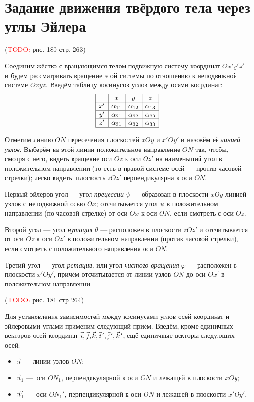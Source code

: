 \section{Задание движения твёрдого тела через углы Эйлера}

(\textcolor{red}{TODO:} рис. 180 стр. 263)

Соединим жёстко с вращающимся телом подвижную систему координат $Ox'y'z'$ и
будем рассматривать вращение этой системы по отношению к неподвижной системе
$Oxyz$. Введём таблицу косинусов углов между осями координат:
\begin{equation*}
  \begin{array}{|c|c|c|c|}
    \hline
    & x & y & z \\
    \hline
    x' & \alpha_{11} & \alpha_{12} & \alpha_{13} \\
    \hline
    y' & \alpha_{21} & \alpha_{22} & \alpha_{23} \\
    \hline
    z' & \alpha_{31} & \alpha_{32} & \alpha_{33} \\
    \hline
  \end{array}
\end{equation*}

Отметим линию $ON$ пересечения плоскостей $xOy$ и $x'Oy'$ и назовём её
\textit{линией узлов}. Выберём на этой линии положительное направление $ON$ так,
чтобы, смотря с него, видеть вращение оси $Oz$ к оси $Oz'$ на наименьший угол в
положительном направлении (то есть в правой системе осей --- против часовой
стрелки); легко видеть, плоскость $zOz'$ перпендикулярна к оси $ON$.

Первый эйлеров угол --- угол \textit{прецессии} $\psi$ --- образован в плоскости
$xOy$ линией узлов с неподвижной осью $Ox$; отсчитывается угол $\psi$ в
положительном направлении (по часовой стрелке) от оси $Ox$ к оси $ON$, если
смотреть с оси $Oz$.

Второй угол --- угол \textit{нутации} $\theta$ --- расположен в плоскости $zOz'$
и отсчитывается от оси $Oz$ к оси $Oz'$ в положительном направлении (против
часовой стрелки), если смотреть с положительного направления оси $ON$.

Третий угол --- угол \textit{ротации}, или угол \textit{чистого вращения}
$\varphi$ --- расположен в плоскости $x'Oy'$, причём отсчитывается от линии
узлов $ON$ до оси $Ox'$ в положительном направлении.

(\textcolor{red}{TODO:} рис. 181 стр 264)

Для установления зависимостей между косинусами углов осей координат и эйлеровыми
углами применим следующий приём. Введём, кроме единичных векторов осей координат
$\vec{i}, \vec{j}, \vec{k}, \pvec{i}, \pvec{j}, \pvec{k}$, ещё единичные векторы
следующих осей:
\begin{itemize}
  \item $\vec{n}$ --- линии узлов $ON$;
  \item $\vec{n}_1$ --- оси $ON_1$, перпендикулярной к оси $ON$ и лежащей в
    плоскости $xOy$;
  \item $\pvec{n}_1$ --- оси $ON_1'$, перпендикулярной к оси $ON$ и лежащей в
    плоскости $x'Oy'$.
\end{itemize}

